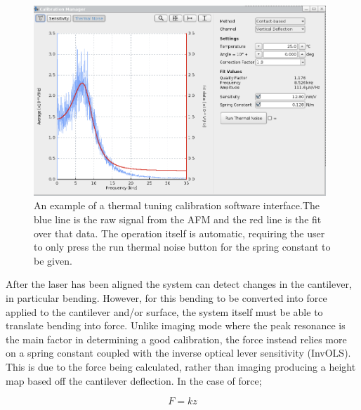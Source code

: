 \begin{figure}[h!!!]     %
        \begin{center}
          \includegraphics[width=110mm]{chapter2/caliEg.png}
\end{center}
\caption{An example of a thermal tuning calibration software interface.The blue line is the raw signal from the AFM and the red line is the fit over that data. The operation itself is automatic, requiring the user to only press the run thermal noise button for the spring constant to be given.}
\label{fig:caliEg}                 %
\end{figure}



After the laser has been aligned the system can detect changes in the cantilever, in particular bending. However, for this bending to be converted into force applied to the cantilever and/or surface, the system itself must be able to translate bending into force. Unlike imaging mode where the peak resonance is the main factor in determining a good calibration, the force instead relies more on a spring constant coupled with the inverse optical lever sensitivity (InvOLS). This is due to the force being calculated, rather than imaging producing a height map based off the cantilever deflection. In the case of force; 

\begin{equation}
F = kz
\end{equation}

